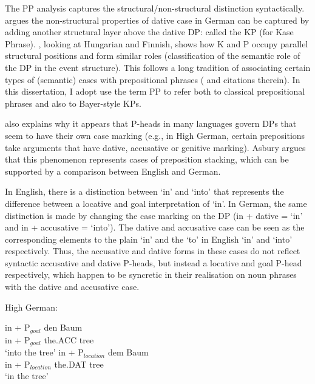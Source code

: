 The PP analysis captures the structural/non-structural distinction syntactically. \cite{Bayer.2001} argues the non-structural properties of dative case in German can be captured by adding another structural layer above the dative DP: called the KP (for Kase Phrase). \cite{Asbury.2005,Asbury.2007}, looking at Hungarian and Finnish, shows how K and P occupy parallel structural positions and form similar roles (classification of the semantic role of the DP in the event structure). This follows a long tradition of associating certain types of (semantic) cases with prepositional phrases (\citealt{McFadden.2004} and citations therein). In this dissertation, I adopt use the term PP to refer both to classical prepositional phrases and also to Bayer-style KPs.

\cite{Asbury.2005} also explains why it appears that P-heads in many languages govern DPs that seem to have their own case marking (e.g., in High German, certain prepositions take arguments that have dative, accusative or genitive marking). Asbury argues that this phenomenon represents cases of preposition stacking, which can be supported by a comparison between English and German. 

In English, there is a distinction between `in' and `into' that represents the difference between a locative and goal interpretation of `in'. In German, the same distinction is made by changing the case marking on the DP (in + dative = `in' and in + accusative = `into'). The dative and accusative case can be seen as the corresponding elements to the plain `in' and the `to' in English `in' and `into' respectively. Thus, the accusative and dative forms in these cases do not reflect syntactic accusative and dative P-heads, but instead a locative and goal P-head respectively, which happen to be syncretic in their realisation on noun phrases with the dative and accusative case.

\begin{exe}
	\ex High German:\label{ex:hg-Pcomp}
	\begin{xlist}
		\ex \gll in + P$_{goal}$ den Baum\\
			 in + P$_{goal}$ the.ACC tree\\
			 \trans `into the tree'
		\ex \gll in + P$_{location}$ dem Baum\\
			 in + P$_{location}$ the.DAT tree\\
			 \trans `in the tree'
	\end{xlist}

\end{exe}

